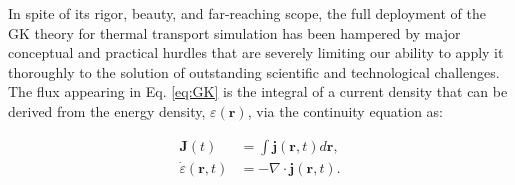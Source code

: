 In spite of its rigor, beauty, and far-reaching scope, the full deployment of the GK theory for thermal transport simulation has been hampered by major conceptual and practical hurdles that are severely limiting our ability to apply it thoroughly to the solution of outstanding scientific and technological challenges. The flux appearing in Eq. \eqref{eq:GK} is the integral of a current density that can be derived from the energy density, $\varepsilon(\mathbf{r})$, via the continuity equation as:
\begin{linenomath}\begin{align}
\mathbf{J}(t) &= \int \mathbf{j}(\mathbf{r},t) d\mathbf{r}, \\
\dot\varepsilon(\mathbf{r},t)&=-\nabla\cdot \mathbf{j}(\mathbf{r},t).
\end{align}\end{linenomath}
